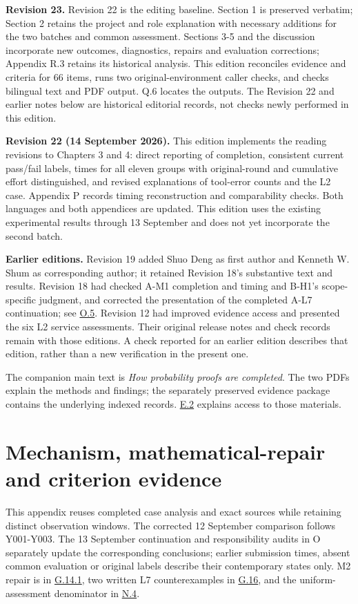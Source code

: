 \textbf{Revision 23.} Revision 22 is the editing baseline. Section 1 is preserved verbatim; Section 2 retains the project and role explanation with necessary additions for the two batches and common assessment. Sections 3-5 and the discussion incorporate new outcomes, diagnostics, repairs and evaluation corrections; Appendix R.3 retains its historical analysis. This edition reconciles evidence and criteria for 66 items, runs two original-environment caller checks, and checks bilingual text and PDF output. Q.6 locates the outputs. The Revision 22 and earlier notes below are historical editorial records, not checks newly performed in this edition.

\textbf{Revision 22 (14 September 2026).} This edition implements the reading revisions to Chapters 3 and 4: direct reporting of completion, consistent current pass/fail labels, times for all eleven groups with original-round and cumulative effort distinguished, and revised explanations of tool-error counts and the L2 case. Appendix P records timing reconstruction and comparability checks. Both languages and both appendices are updated. This edition uses the existing experimental results through 13 September and does not yet incorporate the second batch.

\textbf{Earlier editions.} Revision 19 added Shuo Deng as first author and Kenneth W. Shum as corresponding author; it retained Revision 18's substantive text and results. Revision 18 had checked A-M1 completion and timing and B-H1's scope-specific judgment, and corrected the presentation of the completed A-L7 continuation; see \hyperlink{o5}{O.5}. Revision 12 had improved evidence access and presented the six L2 service assessments. Their original release notes and check records remain with those editions. A check reported for an earlier edition describes that edition, rather than a new verification in the present one.

The companion main text is \emph{How probability proofs are completed}. The two PDFs explain the methods and findings; the separately preserved evidence package contains the underlying indexed records. \hyperlink{e2}{E.2} explains access to those materials.

\section[Mechanism, mathematical-repair and criterion evidence]{\texorpdfstring{\protect\hypertarget{appendix-g}{}Mechanism, mathematical-repair and criterion evidence}{Mechanism, mathematical-repair and criterion evidence}}
This appendix reuses completed case analysis and exact sources while retaining distinct observation windows. The corrected 12 September comparison follows Y001-Y003. The 13 September continuation and responsibility audits in O separately update the corresponding conclusions; earlier submission times, absent common evaluation or original labels describe their contemporary states only. M2 repair is in \hyperlink{g14-1}{G.14.1}, two written L7 counterexamples in \hyperlink{g16}{G.16}, and the uniform-assessment denominator in \hyperlink{n4}{N.4}.

